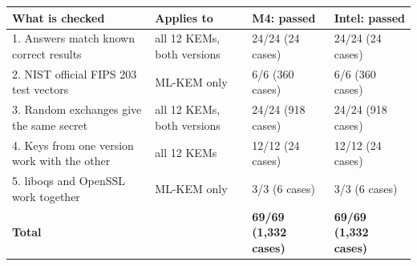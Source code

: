 \begin{tabular}{llll}
\toprule
What is checked & Applies to & M4: passed & Intel: passed \\
\midrule
1. Answers match known correct results & all 12 KEMs, both versions & 24/24 (24 cases) & 24/24 (24 cases) \\
2. NIST official FIPS 203 test vectors & ML-KEM only & 6/6 (360 cases) & 6/6 (360 cases) \\
3. Random exchanges give the same secret & all 12 KEMs, both versions & 24/24 (918 cases) & 24/24 (918 cases) \\
4. Keys from one version work with the other & all 12 KEMs & 12/12 (24 cases) & 12/12 (24 cases) \\
5. liboqs and OpenSSL work together & ML-KEM only & 3/3 (6 cases) & 3/3 (6 cases) \\
\midrule
\textbf{Total} &  & \textbf{69/69 (1,332 cases)} & \textbf{69/69 (1,332 cases)} \\
\bottomrule
\end{tabular}
